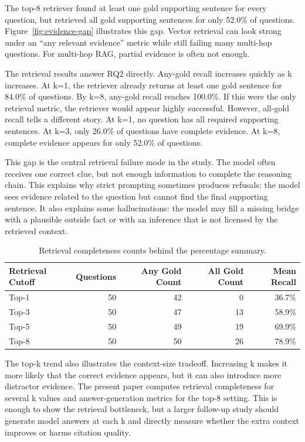 \documentclass[10pt,twocolumn]{article}
\begin{document}
The top-8 retriever found at least one gold supporting sentence for every question, but retrieved all gold supporting sentences for only 52.0\% of questions. Figure~\ref{fig:evidence-gap} illustrates this gap. Vector retrieval can look strong under an ``any relevant evidence'' metric while still failing many multi-hop questions. For multi-hop RAG, partial evidence is often not enough.

The retrieval results answer RQ2 directly. Any-gold recall increases quickly as k increases. At k=1, the retriever already returns at least one gold sentence for 84.0\% of questions. By k=8, any-gold recall reaches 100.0\%. If this were the only retrieval metric, the retriever would appear highly successful. However, all-gold recall tells a different story. At k=1, no question has all required supporting sentences. At k=3, only 26.0\% of questions have complete evidence. At k=8, complete evidence appears for only 52.0\% of questions.

This gap is the central retrieval failure mode in the study. The model often receives one correct clue, but not enough information to complete the reasoning chain. This explains why strict prompting sometimes produces refusals: the model sees evidence related to the question but cannot find the final supporting sentence. It also explains some hallucinations: the model may fill a missing bridge with a plausible outside fact or with an inference that is not licensed by the retrieved context.

\begin{table}[t]
\centering
\small
\begin{tabular}{lrrrr}
\toprule
\textbf{Retrieval Cutoff} & \textbf{Questions} & \textbf{Any Gold Count} & \textbf{All Gold Count} & \textbf{Mean Recall} \\
\midrule
Top-1 & 50 & 42 & 0 & 36.7\% \\
Top-3 & 50 & 47 & 13 & 58.9\% \\
Top-5 & 50 & 49 & 19 & 69.9\% \\
Top-8 & 50 & 50 & 26 & 78.9\% \\
\bottomrule
\end{tabular}
\caption{Retrieval completeness counts behind the percentage summary.}
\label{tab:retrieval-counts}
\end{table}

The top-k trend also illustrates the context-size tradeoff. Increasing k makes it more likely that the correct evidence appears, but it can also introduce more distractor evidence. The present paper computes retrieval completeness for several k values and answer-generation metrics for the top-8 setting. This is enough to show the retrieval bottleneck, but a larger follow-up study should generate model answers at each k and directly measure whether the extra context improves or harms citation quality.
\end{document}
